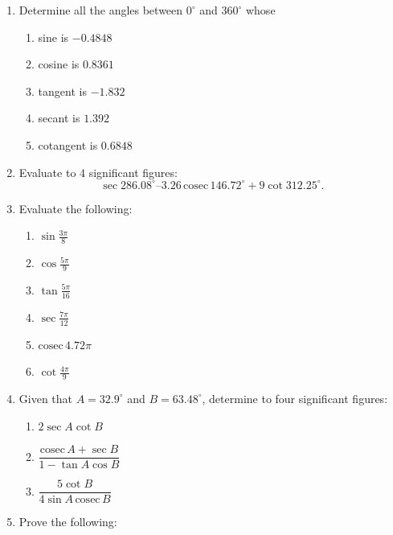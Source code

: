 \documentclass[
  12pt,
  oneside]{book}
\providecommand{\tightlist}{%
  \setlength{\itemsep}{0pt}\setlength{\parskip}{0pt}}
\theoremstyle{definition}
\theoremstyle{definition}
\theoremstyle{definition}
\theoremstyle{definition}
\theoremstyle{remark}
\begin{document}
\begin{enumerate}
\def\labelenumi{\arabic{enumi}.}
\item
  Determine all the angles between \(0^\circ\) and \(360^\circ\) whose

  \begin{enumerate}
  \def\labelenumii{\roman{enumii})}
  \tightlist
  \item
    sine is \(-0.4848\)
  \item
    cosine is \(0.8361\)
  \item
    tangent is \(-1.832\)
  \item
    secant is \(1.392\)
  \item
    cotangent is \(0.6848\)
  \end{enumerate}
\item
  Evaluate to 4 significant figures:
  \[
  \sec 286.08^\circ – 3.26 \,\mathrm{cosec}\, 146.72^\circ + 9 \cot 312.25^\circ.
  \]
\item
  Evaluate the following:

  \begin{enumerate}
  \def\labelenumii{\roman{enumii})}
  \tightlist
  \item
    \(\sin\frac{3\pi}{8}\)
  \item
    \(\cos\frac{5\pi}{9}\)
  \item
    \(\tan\frac{5\pi}{16}\)
  \item
    \(\sec\frac{7\pi}{12}\)
  \item
    \(\mathrm{cosec}\,4.72\pi\)
  \item
    \(\cot \frac{4\pi}{9}\)
  \end{enumerate}
\item
  Given that \(A=32.9^\circ\) and \(B=63.48^\circ\), determine to four significant figures:

  \begin{enumerate}
  \def\labelenumii{\roman{enumii})}
  \tightlist
  \item
    \(2\sec A\cot B\)
  \item
    \(\dfrac{\mathrm{cosec}\,A+\sec B}{1-\tan A\cos B}\)
  \item
    \(\dfrac{5\cot B}{4\sin A\,\mathrm{cosec}\, B}\)
  \end{enumerate}
\item
  Prove the following:


\end{enumerate}
\end{document}
